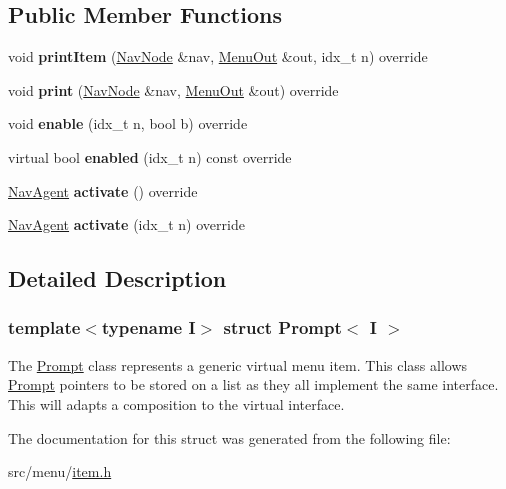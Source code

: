\subsection*{Public Member Functions}
\begin{DoxyCompactItemize}
\item 
\mbox{\label{structPrompt_ad8624b0a82f850df31fe99362978cb85}} 
void {\bfseries print\+Item} (\hyperlink{structNavNode}{Nav\+Node} \&nav, \hyperlink{structMenuOut}{Menu\+Out} \&out, idx\+\_\+t n) override
\item 
\mbox{\label{structPrompt_a75c7b87e4cd6c54625c571469d48021f}} 
void {\bfseries print} (\hyperlink{structNavNode}{Nav\+Node} \&nav, \hyperlink{structMenuOut}{Menu\+Out} \&out) override
\item 
\mbox{\label{structPrompt_a64dcc2b5814ba7220cf8470596300665}} 
void {\bfseries enable} (idx\+\_\+t n, bool b) override
\item 
\mbox{\label{structPrompt_ab129ad3f038faa401a3a33d6311a639b}} 
virtual bool {\bfseries enabled} (idx\+\_\+t n) const override
\item 
\mbox{\label{structPrompt_adf56bea32063d10f18114b7d717a6385}} 
\hyperlink{structNavAgent}{Nav\+Agent} {\bfseries activate} () override
\item 
\mbox{\label{structPrompt_a18fa294421701b96e40e145c79380ad7}} 
\hyperlink{structNavAgent}{Nav\+Agent} {\bfseries activate} (idx\+\_\+t n) override
\end{DoxyCompactItemize}


\subsection{Detailed Description}
\subsubsection*{template$<$typename I$>$\newline
struct Prompt$<$ I $>$}

The \hyperlink{structPrompt}{Prompt} class represents a generic virtual menu item. This class allows \hyperlink{structPrompt}{Prompt} pointers to be stored on a list as they all implement the same interface. This will adapts a composition to the virtual interface. 

The documentation for this struct was generated from the following file\+:\begin{DoxyCompactItemize}
\item 
src/menu/\hyperlink{item_8h}{item.\+h}\end{DoxyCompactItemize}
